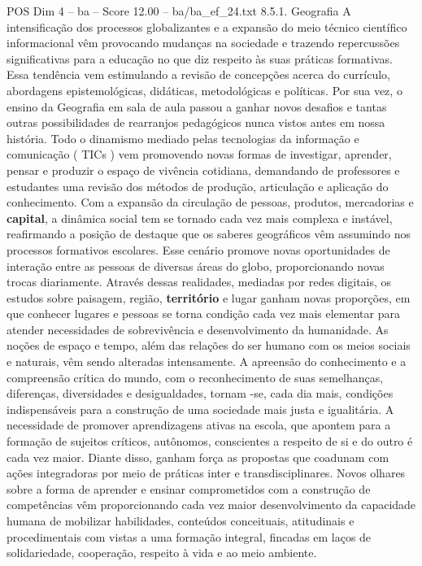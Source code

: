 \begin{textsample}{POS Dim 4 – ba – Score 12.00 – ba/ba\_ef\_24.txt}  \label{ex:f4_pos_030}
8.5.1.
Geografia A intensificação dos processos globalizantes e a expansão do meio técnico científico informacional vêm provocando mudanças na sociedade e trazendo repercussões significativas para a educação no que diz respeito às suas práticas formativas.
Essa tendência vem estimulando a revisão de concepções acerca do currículo, abordagens epistemológicas, didáticas, metodológicas e políticas.
Por sua vez, o ensino da Geografia em sala de aula passou a ganhar novos desafios e tantas outras possibilidades de rearranjos pedagógicos nunca vistos antes em nossa história.
Todo o dinamismo mediado pelas tecnologias da informação e comunicação ( TICs ) vem promovendo novas formas de investigar, aprender, pensar e produzir o espaço de vivência cotidiana, demandando de professores e estudantes uma revisão dos métodos de produção, articulação e aplicação do conhecimento.
Com a expansão da circulação de pessoas, produtos, mercadorias e \textbf{capital}, a dinâmica social tem se tornado cada vez mais complexa e instável, reafirmando a posição de destaque que os saberes geográficos vêm assumindo nos processos formativos escolares.
Esse cenário promove novas oportunidades de interação entre as pessoas de diversas áreas do globo, proporcionando novas trocas diariamente.
Através dessas realidades, mediadas por redes digitais, os estudos sobre paisagem, região, \textbf{território} e lugar ganham novas proporções, em que conhecer lugares e pessoas se torna condição cada vez mais elementar para atender necessidades de sobrevivência e desenvolvimento da humanidade.
As noções de espaço e tempo, além das relações do ser humano com os meios sociais e naturais, vêm sendo alteradas intensamente.
A apreensão do conhecimento e a compreensão crítica do mundo, com o reconhecimento de suas semelhanças, diferenças, diversidades e desigualdades, tornam -se, cada dia mais, condições indispensáveis para a construção de uma sociedade mais justa e igualitária.
A necessidade de promover aprendizagens ativas na escola, que apontem para a formação de sujeitos críticos, autônomos, conscientes a respeito de si e do outro é cada vez maior.
Diante disso, ganham força as propostas que coadunam com ações integradoras por meio de práticas inter e transdisciplinares.
Novos olhares sobre a forma de aprender e ensinar comprometidos com a construção de competências vêm proporcionando cada vez maior desenvolvimento da capacidade humana de mobilizar habilidades, conteúdos conceituais, atitudinais e procedimentais com vistas a uma formação integral, fincadas em laços de solidariedade, cooperação, respeito à vida e ao meio ambiente.

\end{textsample}
